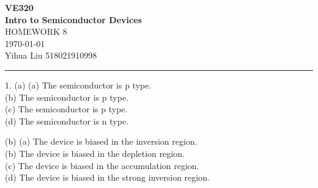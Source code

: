\documentclass[a4paper]{article}
\begin{document}
\begin{center}
\huge
\textbf{VE320\\Intro to Semiconductor Devices\\}
\Large
\vspace{30pt}
\uppercase{Homework 8}\\
\vspace{5pt}\today\\
\vspace{5pt}
Yihua Liu 518021910998
\vspace{5pt}
\rule[-10pt]{.97\linewidth}{0.05em}
\end{center}
1. (a) (a) The semiconductor is p type.\\
(b) The semiconductor is p type.\\
(c) The semiconductor is p type.\\
(d) The semiconductor is n type.

(b) (a) The device is biased in the inversion region.\\
(b) The device is biased in the depletion region.\\
(c) The device is biased in the accumulation region.\\
(d) The device is biased in the strong inversion region.
\end{document}
